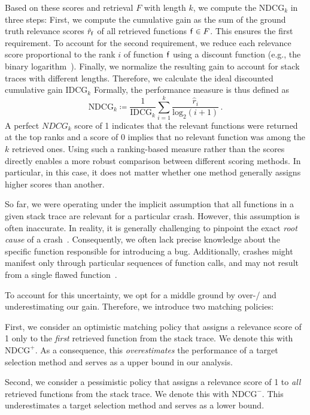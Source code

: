 Based on these scores and retrieval $F$ with length $k$, we compute the $\text{NDCG}_k$ in three steps: First, we compute the cumulative gain as the sum of the ground truth relevance scores $\hat{r}_{\mathsf{f}}$ of all retrieved functions $\mathsf{f}\in F$. This ensures the first requirement. To account for the second requirement, we reduce each relevance score proportional to the rank $i$ of function $\mathsf{f}$ using a discount function (e.g., the binary logarithm~\cite{WanWanLiHe13}).
%
Finally, we normalize the resulting gain to account for stack traces with different lengths. Therefore, we calculate the ideal discounted cumulative gain $\text{IDCG}_k$ 
%
\noindent
Formally, the performance measure is thus defined as
$$
\text{NDCG}_k \coloneqq  \frac{1}{\text{IDCG}_k} \sum_{i=1}^{k} \frac{\hat{r}_i}{\text{log}_2(i+1)} \,.
$$
\cstart 
A perfect $NDCG_k$ score of 1 indicates that the relevant functions were returned at the top ranks and a score of 0 implies that no relevant function was among the $k$ retrieved ones. 
%
Using such a ranking-based measure rather than the scores directly enables a more robust comparison between different scoring methods. In particular, in this case, it does not matter whether one method generally assigns higher scores than another.
\cend

So far, we were operating under the implicit assumption that all functions in a given stack trace are relevant for a particular crash.
%
However, this assumption is often inaccurate. In reality, it is generally challenging to pinpoint the exact \emph{root cause} of a crash~\cite{BlaSchAscAbb+20}. Consequently, we often lack precise knowledge about the specific function responsible for introducing a bug. Additionally, crashes might manifest only through particular sequences of function calls, and may not result from a single flawed function~\cite{ZhuBöh21}.

To account for this uncertainty, we opt for a middle ground by over-/ and underestimating our gain. Therefore, we introduce two matching policies:

 First, we consider an optimistic matching policy that assigns a relevance score of 1 only to the \emph{first} retrieved function from the stack trace. We denote this with $\text{NDCG}^+$. As a consequence, this \emph{overestimates} the performance of a target selection method and serves as a upper bound in our analysis.

 Second, we consider a pessimistic policy that assigns a relevance score of 1 to \emph{all} retrieved functions from the stack trace. We denote this with $\text{NDCG}^-$. This underestimates a target selection method and serves as a lower bound.
